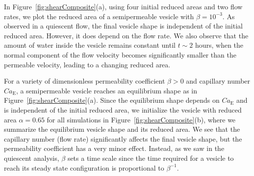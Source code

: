 \documentclass[prb,preprint,showpacs,preprintnumbers,amsmath,amssymb,longbibliography]{revtex4-1}
\begin{document}
In Figure~\ref{fig:shearComposite}(a), using four initial reduced areas
and two flow rates, we plot the reduced area of a semipermeable vesicle
with $\beta = 10^{-3}$. As observed in a quiescent flow, the final
vesicle shape is independent of the initial reduced area. However, it
does depend on the flow rate. We also observe that the amount of water
inside the vesicle remains constant until $t\sim 2$ hours, when the
normal component of the flow velocity becomes significantly smaller than
the permeable velocity, leading to a changing reduced area.

For a variety of dimensionless permeability coefficient $\beta>0$ and
capillary number $Ca_\mathrm{E}$, a semipermeable vesicle reaches an
equilibrium shape as in Figure~\ref{fig:shearComposite}(a). Since the
equilibrium shape depends on $Ca_\mathrm{E}$ and is independent of the
initial reduced area, we initialize the vesicle with reduced area
$\alpha = 0.65$ for all simulations in
Figure~\ref{fig:shearComposite}(b), where we summarize the equilibrium
vesicle shape and its reduced area. We see that the capillary number
(flow rate) significantly affects the final vesicle shape, but the
permeability coefficient has a very minor effect. Instead, as we saw in
the quiescent analysis, $\beta$ sets a time scale since the time
required for a vesicle to reach its steady state configuration is
proportional to $\beta^{-1}$.
\end{document}
